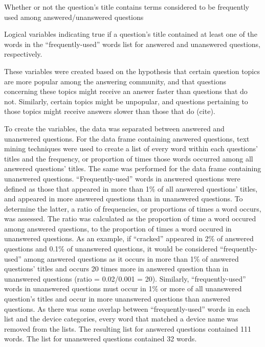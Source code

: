 \documentclass{article}
\begin{document}
Whether or not the question's title contains terms considered to be frequently used among answered/unanswered questions

Logical variables indicating true if a question's title contained at least one of the words in the ``frequently-used'' words list for answered and unanswered questions, respectively. 

These variables were created based on the hypothesis that certain question topics are more popular among the answering community, and that questions concerning these topics might receive an answer faster than questions that do not. Similarly, certain topics might be unpopular, and questions pertaining to those topics might receive answers slower than those that do (cite).
  
To create the variables, the data was separated between answered and unanswered questions. For the data frame containing answered questions, text mining techniques were used to create a list of every word within each questions' titles and the frequency, or proportion of times those words occurred among all answered questions' titles. The same was performed for the data frame containing unanswered questions. ``Frequently-used'' words in answered questions were defined as those that appeared in more than 1\% of all answered questions' titles, and appeared in more answered questions than in unanswered questions. To determine the latter, a ratio of frequencies, or proportions of times a word occurs, was assessed. The ratio was calculated as the proportion of time a word occured among answered questions, to the proportion of times a word occured in unanswered questions. As an example, if ``cracked'' appeared in 2\% of answered questions and 0.1\% of unanswered questions, it would be considered ``frequently-used'' among answered questions as it occurs in more than 1\% of answered questions' titles and occurs 20 times more in answered question than in unanswered questions (ratio = 0.02/0.001 = 20). Similarly, ``frequently-used'' words in unanswered questions must occur in 1\% or more of all unanswered question's titles and occur in more unanswered questions than answered questions. As there was some overlap between ``frequently-used'' words in each list and the device categories, every word that matched a device name was removed from the lists. The resulting list for answered questions contained 111 words. The list for unanswered questions contained 32 words. 
\end{document}
